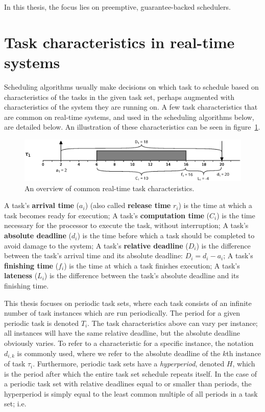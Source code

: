 \noindent In this thesis, the focus lies on preemptive, guarantee-backed schedulers.

\section{Task characteristics in real-time systems}
Scheduling algorithms usually make decisions on which task to schedule based on characteristics of the tasks in the given task set, perhaps augmented with characteristics of the system they are running on. A few task characteristics that are common on real-time systems, and used in the scheduling algorithms below, are detailed below. An illustration of these characteristics can be seen in figure~\ref{fig:taskcharacteristics}.

\begin{figure}[htpb]
    \centering
    \includegraphics[width=\textwidth]{figures/taskcharacteristics.eps}
    \caption{An overview of common real-time task characteristics.}
    \label{fig:taskcharacteristics}
\end{figure}

\begin{outline}
    \1 A task's \textbf{arrival time} ($a_i$) (also called \textbf{release time} $r_i$) is the time at which a task becomes ready for execution;
    \1 A task's \textbf{computation time} ($C_i$) is the time necessary for the processor to execute the task, without interruption;
    \1 A task's \textbf{absolute deadline} ($d_i$) is the time before which a task should be completed to avoid damage to the system;
    \1 A task's \textbf{relative deadline} ($D_i$) is the difference between the task's arrival time and its absolute deadline: $D_i = d_i - a_i$;
    \1 A task's \textbf{finishing time} ($f_i$) is the time at which a task finishes execution;
    \1 A task's \textbf{lateness} ($L_i$) is the difference between the task's absolute deadline and its finishing time.
\end{outline}

\noindent This thesis focuses on periodic task sets, where each task consists of an infinite number of task instances which are run periodically. The period for a given periodic task is denoted $T_i$. The task characteristics above can vary per instance; all instances will have the same relative deadline, but the absolute deadline obviously varies. To refer to a characteristic for a specific instance, the notation $d_{i,k}$ is commonly used, where we refer to the absolute deadline of the $k$th instance of task $\tau_i$. Furthermore, periodic task sets have a \emph{hyperperiod}, denoted $H$, which is the period after which the entire task set schedule repeats itself. In the case of a periodic task set with relative deadlines equal to or smaller than periods, the hyperperiod is simply equal to the least common multiple of all periods in a task set; i.e.

